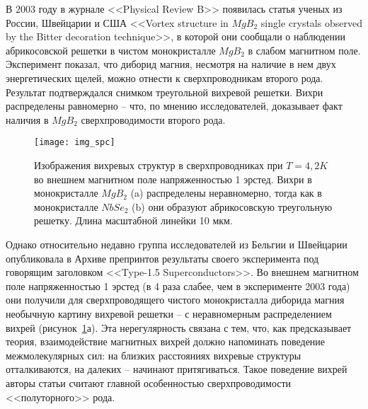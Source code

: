 В 2003 году в журнале <<Physical Review B>> появилась статья ученых из России, 
Швейцарии и США <<Vortex structure in \( MgB_2 \) single crystals observed by 
the Bitter decoration technique>>, в которой они сообщали о наблюдении 
абрикосовской решетки в чистом монокристалле \( MgB_2 \) в слабом магнитном 
поле. Эксперимент показал, что диборид магния, несмотря на наличие в нем двух 
энергетических щелей, можно отнести к сверхпроводникам второго рода. 
Результат подтверждался снимком треугольной вихревой решетки. Вихри 
распределены равномерно -- что, по мнению исследователей, доказывает факт 
наличия в \( MgB_2 \) сверхпроводимости второго рода.

\begin{figure}[h!]
    \center
    \texttt{[image: img\_spc]}
    \caption{Изображения вихревых структур в сверхпроводниках при 
        \( T = 4,2 K \) во внешнем магнитном поле напряженностью 1 эрстед.
        Вихри в монокристалле \( MgB_2 \) (a) распределены неравномерно, тогда 
        как в монокристалле \( NbSe_2 \) (b) они образуют абрикосовскую 
        треугольную решетку. Длина масштабной линейки 10 мкм.}
    \label{img:spc}
\end{figure}

Однако относительно недавно группа исследователей из Бельгии и Швейцарии 
опубликовала в Архиве препринтов результаты своего эксперимента под говорящим 
заголовком <<Type-1.5 Superconductors>>. Во внешнем магнитном поле 
напряженностью 1 эрстед (в 4 раза слабее, чем в эксперименте 2003 года) они 
получили для сверхпроводящего чистого монокристалла диборида магния необычную 
картину вихревой решетки -- с неравномерным распределением вихрей 
(рисунок~\ref{img:spc}а). Эта нерегулярность связана с тем, что, как 
предсказывает теория, взаимодействие магнитных вихрей должно напоминать 
поведение межмолекулярных сил: на близких расстояниях вихревые структуры 
отталкиваются, на далеких -- начинают притягиваться. Такое поведение вихрей 
авторы статьи считают главной особенностью сверхпроводимости <<полуторного>> 
рода. \cite{bib:superconductors}

